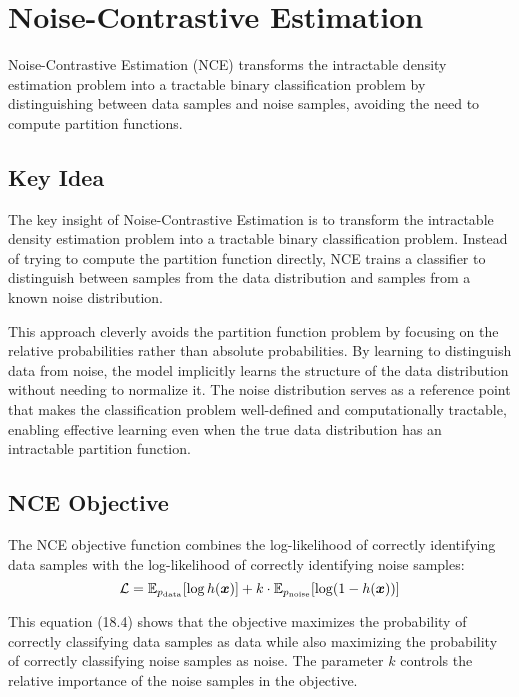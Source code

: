 
\section{Noise-Contrastive Estimation }
\label{sec:nce}

Noise-Contrastive Estimation (NCE) transforms the intractable density estimation problem into a tractable binary classification problem by distinguishing between data samples and noise samples, avoiding the need to compute partition functions.


\subsection{Key Idea}

The key insight of Noise-Contrastive Estimation is to transform the intractable density estimation problem into a tractable binary classification problem. Instead of trying to compute the partition function directly, NCE trains a classifier to distinguish between samples from the data distribution and samples from a known noise distribution.

This approach cleverly avoids the partition function problem by focusing on the relative probabilities rather than absolute probabilities. By learning to distinguish data from noise, the model implicitly learns the structure of the data distribution without needing to normalize it. The noise distribution serves as a reference point that makes the classification problem well-defined and computationally tractable, enabling effective learning even when the true data distribution has an intractable partition function.

\subsection{NCE Objective}

The NCE objective function combines the log-likelihood of correctly identifying data samples with the log-likelihood of correctly identifying noise samples:
\begin{equation}
\mathcal{L} = \mathbb{E}_{p_{\text{data}}}[\log h(\boldsymbol{x})] + k \cdot \mathbb{E}_{p_{\text{noise}}}[\log(1-h(\boldsymbol{x}))]
\end{equation}

This equation (18.4) shows that the objective maximizes the probability of correctly classifying data samples as data while also maximizing the probability of correctly classifying noise samples as noise. The parameter $k$ controls the relative importance of the noise samples in the objective.

